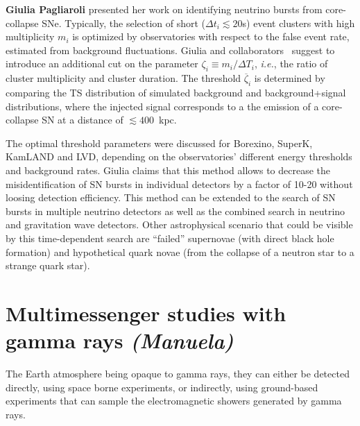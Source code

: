 \documentclass{PoS}
\begin{document}
{\bf Giulia Pagliaroli} presented her work on identifying neutrino bursts from core-collapse SNe. Typically, the selection of short ($\Delta t_i\lesssim 20$s) event clusters with high multiplicity $m_i$ is optimized by observatories with respect to the false event rate, estimated from background fluctuations. Giulia and collaborators~\cite{Casentini:2018bdf} suggest to introduce an additional cut on the parameter $\zeta_i \equiv m_i/\Delta T_i$, {\it i.e.}, the ratio of cluster multiplicity and cluster duration. The threshold $\overline{\zeta}_i$ is determined by comparing the TS distribution of simulated background and background+signal distributions, where the injected signal corresponds to a the emission of a core-collapse SN at a distance of $\lesssim400$~kpc. 

The optimal threshold parameters were discussed for Borexino, SuperK, KamLAND and LVD, depending on the observatories' different energy thresholds and background rates. Giulia claims that this method allows to decrease the misidentification of SN bursts in individual detectors by a factor of 10-20 without loosing detection efficiency. This method can be extended to the search of SN bursts in multiple neutrino detectors as well as the combined search in neutrino and gravitation wave detectors. Other astrophysical scenario that could be visible by this time-dependent search are ``failed'' supernovae (with direct black hole formation) and hypothetical quark novae (from the collapse of a neutron star to a strange quark star).


\section{Multimessenger studies with gamma rays {\it (Manuela)}}
The Earth atmosphere being opaque to gamma rays, they can either be  detected directly, using space borne experiments, or indirectly, using ground-based experiments that can sample the electromagnetic showers generated by gamma rays. %
\end{document}
